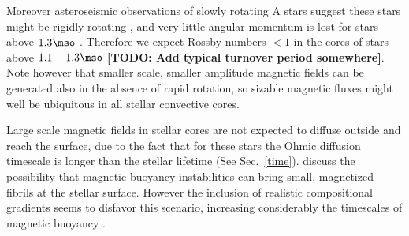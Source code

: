 Moreover asteroseismic observations of slowly rotating A stars suggest these stars might be rigidly rotating \cite{Kurtz_2014}, and very little angular momentum is lost for stars above $1.3\mso$ \citep[Kraft break, see e.g.]{1967ApJ...150..551K,2013ApJ...776...67V}. Therefore we expect Rossby numbers $< 1$ in the cores of stars above $1.1-1.3\mso$ \textbf{[TODO: Add typical turnover period somewhere]}.
Note however that smaller scale, smaller amplitude magnetic fields can be generated also in the absence of rapid rotation, so sizable magnetic fluxes might well be ubiquitous in all stellar convective cores. 

Large scale magnetic fields in stellar cores are not expected to diffuse outside and reach the surface, due to the fact that for these stars the Ohmic diffusion timescale 
is longer than the stellar lifetime (See Sec.~\ref{time}). \citet{MacGregor_2003} discuss the possibility that magnetic buoyancy instabilities can bring small, magnetized fibrils at the stellar surface. However the inclusion of realistic compositional gradients seems to disfavor this scenario, increasing considerably the timescales of magnetic buoyancy \citep{MacDonald_2004}.  







  
 
  
  
  
  
  
  